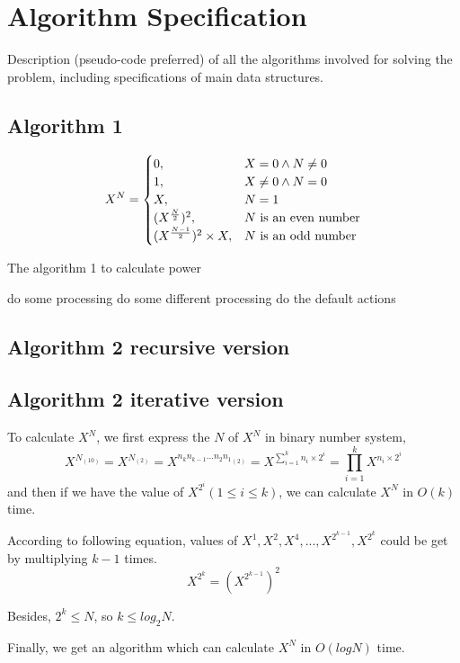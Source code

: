 \chapter{Algorithm Specification}

Description (pseudo-code preferred) of all the algorithms involved for solving the problem, including specifications of main data structures.

\section{Algorithm 1}

\[
X ^ N =
\begin{cases}
	0, & X = 0 \land N \neq 0\\
	1, & X \neq 0 \land N = 0\\
	X, & N = 1\\
	(X ^ {\frac{N}{2}}) ^ 2, & N$ is an even number$\\
	(X ^ {\frac{N - 1}{2}}) ^ 2 \times X, & N$ is an odd number$\\
\end{cases}
\]
\begin{algorithm}[H]
	\caption{ The algorithm 1 to calculate power}
	\begin{algorithmic}[1]
		\STATE do some processing
		\STATE do some different processing
		\ELSE
		\STATE do the default actions
		\ENDIF
	\end{algorithmic}
\end{algorithm}

\section{Algorithm 2 recursive version}
\section{Algorithm 2 iterative version}

To calculate $X ^ N$, we first express the $N$ of $X ^ N$ in binary number system,
\[
X ^ {N_{(10)}} = X ^ {N_{(2)}} = X ^ {{{n_k}{n_{k-1}}{...}{n_2}{n_1}}_{(2)}}
= X ^ {\sum_{i = 1}^{k} n_i \times 2 ^ i}
= \prod_{i = 1}^{k} X ^ {n_i \times 2 ^ i}
\]
and then if we have the value of $X ^ {2 ^ i}(1 \leq i \leq k)$, we can calculate $X ^ N$ in $O(k)$ time.

According to following equation, values of $X ^ 1, X ^ 2, X ^ 4, ..., X ^ {2 ^ {k - 1}}, X ^ {2 ^ k}$ could be get by multiplying $k - 1$ times.
\[
X ^ {2 ^ k} = (X ^ {2 ^ {k - 1}}) ^ 2
\]

Besides, $2 ^ k \leq N$, so $k \leq log_{2}N$.

Finally, we get an algorithm which can calculate $X ^ N$ in $O(logN)$ time.